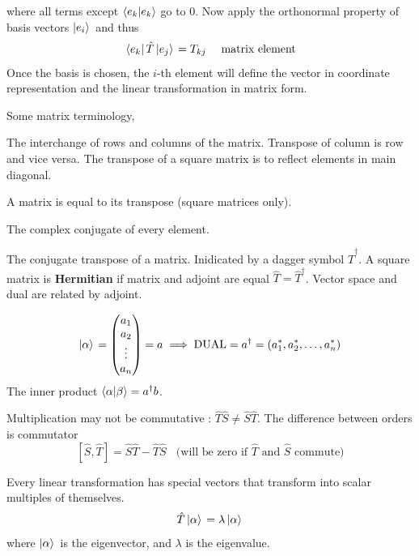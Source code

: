 \documentclass[english, 11pt]{article}
\begin{document}
        where all terms except $\langle e_k | e_k \rangle$ go to 0. Now apply the orthonormal property of basis vectors $\left| e_i \rangle \right.$ and thus
        \[ \bra{e_k}\hat{T}\ket{e_j} = T_{kj} \ \ \ \ \mbox{matrix element} \]
        Once the basis is chosen, the $i$-th element will define the vector in coordinate representation and the linear transformation  in matrix form.
        \newline

        Some matrix terminology,

        \begin{defn}[transpose]\label{transpose}
          The interchange of rows and columns of the matrix. Transpose of column is row and vice versa. The transpose of a square matrix is to reflect elements in main diagonal.
        \end{defn}
        \begin{defn}[symmetric]\label{symmetric}
        A matrix is equal to its transpose (square matrices only).
        \end{defn}
        \begin{defn}[conjugate]\label{conjugate}
        The complex conjugate of every element.
        \end{defn}
        \begin{defn}[adjoint]\label{adjoint}
        The conjugate transpose of a matrix. Inidicated by a dagger symbol $\hat{T}^\dagger$. A square matrix is \textbf{Hermitian} if matrix and adjoint are equal $\hat{T} = \hat{T}^{\dagger}$. Vector space and dual are related by adjoint.
        \end{defn}
        \[ \left| \alpha \rangle \right. = \left(\begin{matrix}a_1 \\ a_2 \\ \vdots \\ a_n\end{matrix}\right) = a \implies \mbox{DUAL} = a^\dagger = (a_1^*, a_2^*,
        \ldots, a_n^*) \]
        The inner product $\langle \alpha | \beta \rangle = a^{\dagger}b$.
        \begin{defn}[product]\label{product}
        Multiplication may not be commutative : $\hat{T}\hat{S} \not = \hat{S}\hat{T}$. The difference between orders is commutator
        \[ [\hat{S}, \hat{T}] = \hat{S}\hat{T} - \hat{T}\hat{S} \ \ \ \ \mbox{(will be zero if $\hat{T}$ and $\hat{S}$ commute)} \]
        \end{defn}

        \begin{defn}\label{eigenvalues, eigenvectors}
        Every linear transformation has special vectors that transform into scalar multiples of themselves.
        \[ \hat{T}\left| \alpha \rangle \right. = \lambda \left| \alpha \rangle \right. \]
        where $\left| \alpha \rangle \right.$ is the eigenvector, and $\lambda$ is the eigenvalue.
        \end{defn}
\end{document}
